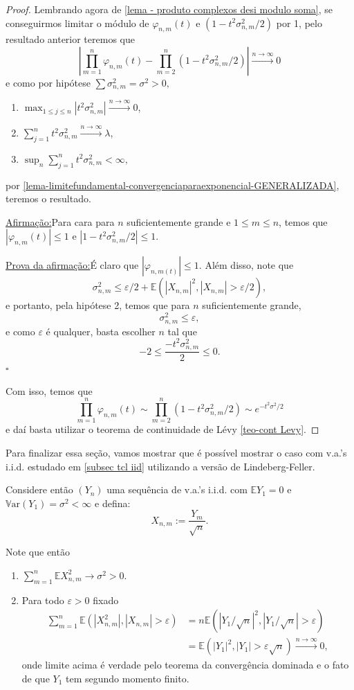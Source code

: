 \documentclass[12pt,a4paper,oneside]{book}
\newenvironment{claim}[1]{\par\noindent\underline{Afirma\c{c}\~ao:}\space#1}{}
\newenvironment{claimproof}[1]{\par\noindent\underline{Prova da afirma\c{c}\~ao:}\space#1}{\hfill $\square$}
\theoremstyle{definition}
\theoremstyle{remark}
\numberwithin{equation}{section}
\newcommand{\e}{\varepsilon}
\newcommand{\E}{\mathbb{E}}
\newcommand{\ds}{\displaystyle}
\newcommand{\Var}{\mathbb{V}\text{ar}}
\newcommand{\rarrowlimn}{\xrightarrow{n\rightarrow \infty}}
\begin{document}
\begin{proof}
Lembrando agora de \ref{lema - produto complexos desi modulo soma}, se conseguirmos limitar o módulo de $\varphi_{n,m}(t)$ e $(1-t^2\sigma^2_{n,m}/2)$ por 1, pelo resultado anterior teremos que
$$\left| \prod_{m=1}^n \varphi_{n,m}(t) - \prod_{m=2}^n(1-t^2\sigma^2_{n,m}/2) \right| \rarrowlimn 0$$
e como por hipótese $\sum \sigma_{n, m}^2 = \sigma^2>0,$
\begin{enumerate}
\item $\ds\max_{1\leq j\leq n}|t^2\sigma^2_{n,m}|\rarrowlimn 0$,
\item $\ds\sum^{n}_{j=1}t^2\sigma^2_{n,m} \rarrowlimn \lambda$,
\item $\ds \sup_n \ds\sum^n_{j=1}t^2\sigma^2_{n,m}<\infty,$
\end{enumerate}
por \ref{lema-limitefundamental-convergenciaparaexponencial-GENERALIZADA}, teremos o resultado.
\bigskip
\begin{claim}
Para cara para $n$ suficientemente grande e  $1\leq m\leq n$, temos que $|\varphi_{n,m}(t)|\leq 1$ e $|1-t^2\sigma^2_{n,m}/2|\leq 1.$
\end{claim}
\begin{claimproof}
É claro que $|\varphi_{n,m(t)}|\leq 1.$
Além disso, note que
$$\sigma_{n,m}^2 \leq \e/2 + \E(|X_{n,m}|^2, |X_{n,m}|>\e/2),$$
e portanto, pela hipótese 2, temos que para $n$ suficientemente grande, 
$$ \sigma_{n,m}^2\leq \e,$$
e como $\e$ é qualquer, basta escolher $n$ tal que
$$-2 \leq \dfrac{-t^2\sigma_{n,m}^2}{2}\leq 0. $$
\end{claimproof}

Com isso, temos que
$$ \prod_{m=1}^n \varphi_{n,m}(t) \sim \prod_{m=2}^n(1-t^2\sigma^2_{n,m}/2)\sim e^{-t^2\sigma^2/2}$$
e daí basta utilizar o teorema de continuidade de Lévy \ref{teo-cont Levy}.

\end{proof}

Para finalizar essa seção, vamos mostrar que é possível mostrar o caso com v.a.'s i.i.d.  estudado em  \ref{subsec tcl iid} utilizando a versão de Lindeberg-Feller.

Considere então $(Y_n)$ uma sequência de v.a.'s i.i.d. com $\E Y_1 = 0$ e $\Var(Y_1) = \sigma^2<\infty$ e defina:
$$X_{n,m} := \dfrac{Y_m}{\sqrt{n}}.$$

Note que então
\begin{enumerate}
\item $\ds\sum^n_{m=1}\E X^2_{n,m} \rightarrow \sigma^2>0. $
\item Para todo $\e>0$ fixado 
\begin{align*}
\sum_{m=1}^n \E(|X_{n,m}^2|, |X_{n,m}|>\e ) & =n\E(|Y_1/\sqrt{n}|^2, |Y_1/\sqrt{n}|>\e )\\
& =\E(|Y_1|^2, |Y_1|>\e\sqrt{n} ) \rarrowlimn 0,
\end{align*}
onde limite acima é verdade pelo teorema da convergência dominada e o fato de que $Y_1$ tem segundo momento finito.
\end{enumerate} 
\end{document}
